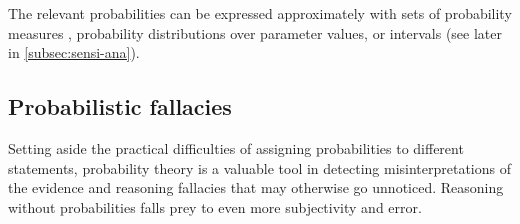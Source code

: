 \documentclass{article}
\newcommand{\pr}{\mathsf{Pr}}
\begin{document}
%
%
%
%
%
The relevant probabilities can be expressed approximately with  sets of probability measures \citep{walley1991statistical,shafer1976mathematical},  probability distributions over parameter values, or intervals (see later in \ref{subsec:sensi-ana}). %

\subsection{Probabilistic fallacies}\label{sec:fallacies}

Setting aside the practical difficulties of assigning probabilities to different statements,
probability theory is a valuable tool in detecting misinterpretations of the evidence and reasoning fallacies that may otherwise go unnoticed. Reasoning without probabilities falls prey to even more subjectivity and error. 
\end{document}
